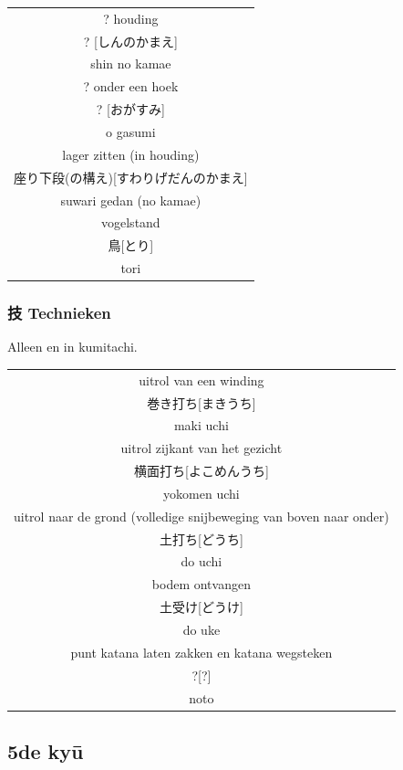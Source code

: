 \documentclass[12pt]{scrartcl}
\begin{document}
\begin{CJK*}{UTF8}{min}
\begin{table}[H]
\begin{center}
\begin{tabular}{c}
\hline
? houding\\
? [しんのかまえ]\\
shin no kamae\\
\hline
? onder een hoek\\
? [おがすみ]\\
o gasumi\\
\hline
lager zitten (in houding)\\
座り下段(の構え)[すわりげだんのかまえ]\\
suwari gedan (no kamae)\\
\hline
vogelstand\\
鳥[とり]\\
tori
\end{tabular}
\end{center}
\label{kyuu_6_katori_kamae}
\end{table}

\subsubsection{技 Technieken}
\noindent Alleen en in kumitachi.
\begin{table}[H]
\begin{center}
\begin{tabular}{c}
uitrol van een winding\\
巻き打ち[まきうち]\\
maki uchi\\
\hline
uitrol zijkant van het gezicht\\
横面打ち[よこめんうち]\\
yokomen uchi\\
\hline
uitrol naar de grond (volledige snijbeweging van boven naar onder)\\
土打ち[どうち]\\
do uchi\\
\hline
bodem ontvangen\\
土受け[どうけ]\\
do uke\\
\hline
punt katana laten zakken en katana wegsteken\\
?[?]\\
noto
\end{tabular}
\end{center}
\label{kyuu_6_katori_other}
\end{table}

\subsection{5de ky\={u}}

\end{CJK*}
\end{document}
